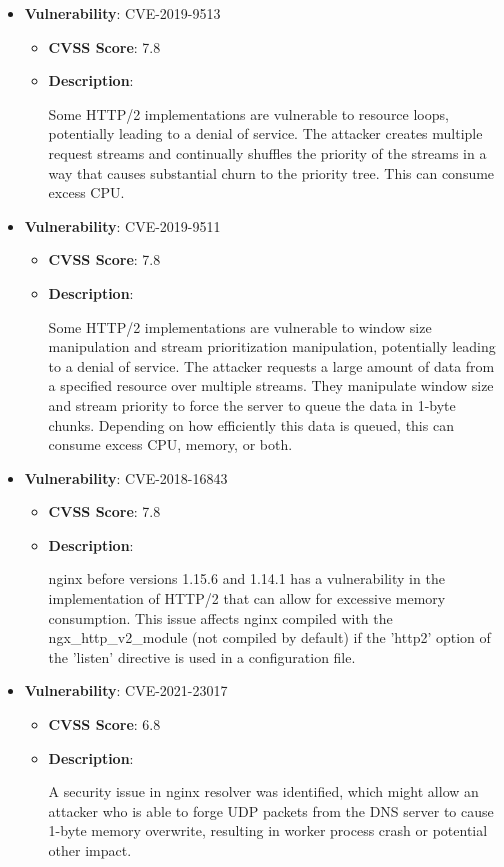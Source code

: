 \documentclass{article}
\begin{document}
\begin{itemize}
        \item \textbf{Vulnerability}: CVE-2019-9513
        \begin{itemize}
            \item \textbf{CVSS Score}:  7.8 
            \item \textbf{Description}:
            \parbox[t]{0.9\linewidth}{
                \ttfamily Some HTTP/2 implementations are vulnerable to resource loops, potentially leading to a denial of service. The attacker creates multiple request streams and continually shuffles the priority of the streams in a way that causes substantial churn to the priority tree. This can consume excess CPU.
            }
        \end{itemize}
    
        \item \textbf{Vulnerability}: CVE-2019-9511
        \begin{itemize}
            \item \textbf{CVSS Score}:  7.8 
            \item \textbf{Description}:
            \parbox[t]{0.9\linewidth}{
                \ttfamily Some HTTP/2 implementations are vulnerable to window size manipulation and stream prioritization manipulation, potentially leading to a denial of service. The attacker requests a large amount of data from a specified resource over multiple streams. They manipulate window size and stream priority to force the server to queue the data in 1-byte chunks. Depending on how efficiently this data is queued, this can consume excess CPU, memory, or both.
            }
        \end{itemize}
    
        \item \textbf{Vulnerability}: CVE-2018-16843
        \begin{itemize}
            \item \textbf{CVSS Score}:  7.8 
            \item \textbf{Description}:
            \parbox[t]{0.9\linewidth}{
                \ttfamily nginx before versions 1.15.6 and 1.14.1 has a vulnerability in the implementation of HTTP/2 that can allow for excessive memory consumption. This issue affects nginx compiled with the ngx\_http\_v2\_module (not compiled by default) if the 'http2' option of the 'listen' directive is used in a configuration file.
            }
        \end{itemize}
    
        \item \textbf{Vulnerability}: CVE-2021-23017
        \begin{itemize}
            \item \textbf{CVSS Score}:  6.8 
            \item \textbf{Description}:
            \parbox[t]{0.9\linewidth}{
                \ttfamily A security issue in nginx resolver was identified, which might allow an attacker who is able to forge UDP packets from the DNS server to cause 1-byte memory overwrite, resulting in worker process crash or potential other impact.
            }
        \end{itemize}
    

\end{itemize}
\end{document}
